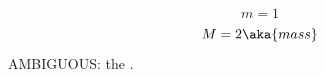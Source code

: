 \documentclass{article}
\begin{document}
\begin{equation} m=1 \label{eq:mass} \end{equation}
\begin{equation} M=2 \aka{mass} \end{equation}
AMBIGUOUS: the .
\end{document}
